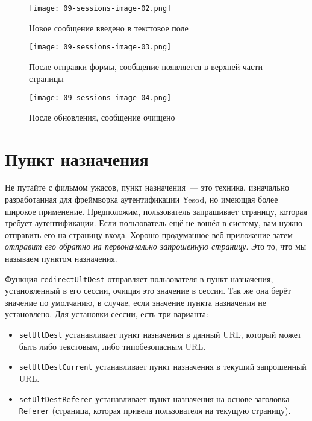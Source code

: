 \begin{figure}[tbh]
  \centering
  \texttt{[image: 09-sessions-image-02.png]}
  \caption{Новое сообщение введено в текстовое поле}
\end{figure}

\begin{figure}[tbh]
  \centering
  \texttt{[image: 09-sessions-image-03.png]}
  \caption{После отправки формы, сообщение появляется в верхней части страницы}
\end{figure}

\begin{figure}[tbh]
  \centering
  \texttt{[image: 09-sessions-image-04.png]}
  \caption{После обновления, сообщение очищено}
\end{figure}

\section{Пункт назначения}

Не путайте с фильмом ужасов, пункт назначения~--- это техника, изначально
разработанная для фреймворка аутентификации Yesod, но имеющая более широкое
применение. Предположим, пользователь запрашивает страницу, которая требует
аутентификации. Если пользователь ещё не вошёл в систему, вам нужно отправить
его на страницу входа. Хорошо продуманное веб-приложение затем \emph{отправит
    его обратно на первоначально запрошенную страницу}. Это то, что мы называем
пунктом назначения.

Функция \lstinline'redirectUltDest' отправляет пользователя в пункт назначения,
установленный в его сессии, очищая это значение в сессии. Так же она берёт
значение по умолчанию, в случае, если значение пункта назначения не
установлено. Для установки сессии, есть три варианта:

\begin{itemize}
  \item \lstinline'setUltDest' устанавливает пункт назначения в данный URL,
      который может быть либо текстовым, либо типобезопасным URL.

  \item \lstinline'setUltDestCurrent' устанавливает пункт назначения в текущий
      запрошенный URL.

  \item \lstinline'setUltDestReferer' устанавливает пункт назначения на основе
      заголовка \lstinline'Referer' (страница, которая привела пользователя на
      текущую страницу).
\end{itemize}

